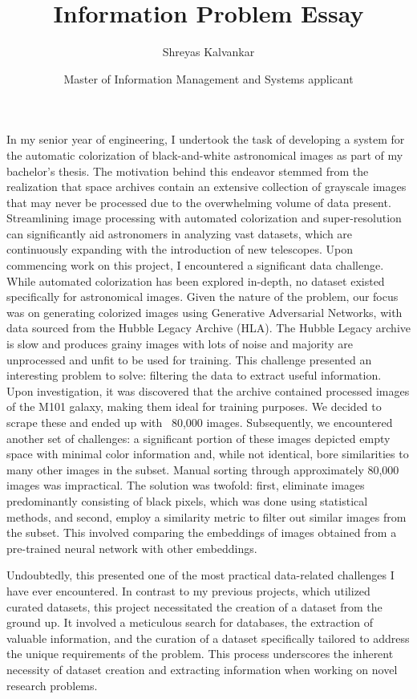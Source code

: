 \documentclass[11pt]{article}
\title{Information Problem Essay}
\author{Shreyas Kalvankar}
\date{Master of Information Management and Systems applicant}
\begin{document}
  \maketitle%
  \thispagestyle{empty}
  \vspace{16pt}

\hspace{0.25in}In my senior year of engineering, I undertook the task of developing a system for the automatic colorization of black-and-white astronomical images as part of my bachelor’s thesis. The motivation behind this endeavor stemmed from the realization that space archives contain an extensive collection of grayscale images that may never be processed due to the overwhelming volume of data present. Streamlining image processing with automated colorization and super-resolution can significantly aid astronomers in analyzing vast datasets, which are continuously expanding with the introduction of new telescopes. Upon commencing work on this project, I encountered a significant data challenge. While automated colorization has been explored in-depth, no dataset existed specifically for astronomical images. Given the nature of the problem, our focus was on generating colorized images using Generative Adversarial Networks, with data sourced from the Hubble Legacy Archive (HLA).  The Hubble Legacy archive is slow and produces grainy images with lots of noise and majority are unprocessed and unfit to be used for training. This challenge presented an interesting problem to solve: filtering the data to extract useful information. Upon investigation, it was discovered that the archive contained processed images of the M101 galaxy, making them ideal for training purposes. We decided to scrape these and ended up with ~80,000 images. Subsequently, we encountered another set of challenges: a significant portion of these images depicted empty space with minimal color information and, while not identical, bore similarities to many other images in the subset. Manual sorting through approximately 80,000 images was impractical. The solution was twofold: first, eliminate images predominantly consisting of black pixels, which was done using statistical methods, and second, employ a similarity metric to filter out similar images from the subset. This involved comparing the embeddings of images obtained from a pre-trained neural network with other embeddings.

\hspace{0.25in}Undoubtedly, this presented one of the most practical
data-related challenges I have ever encountered. In contrast to my previous
projects, which utilized curated datasets, this project necessitated the
creation of a dataset from the ground up. It involved a meticulous search for
databases, the extraction of valuable information, and the curation of a dataset
specifically tailored to address the unique requirements of the problem. This
process underscores the inherent necessity of dataset creation and extracting
information when working on novel research problems.
\end{document}
